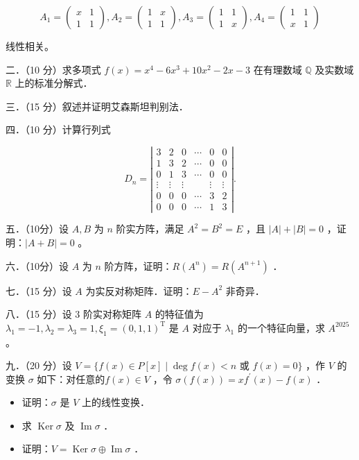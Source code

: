 \documentclass{article}
\begin{document}
\[
A_{1}=\left(\begin{array}{ll}
x & 1 \\
1 & 1
\end{array}\right), A_{2}=\left(\begin{array}{ll}
1 & x \\
1 & 1
\end{array}\right), A_{3}=\left(\begin{array}{ll}
1 & 1 \\
1 & x
\end{array}\right), A_{4}=\left(\begin{array}{ll}
1 & 1 \\
x & 1
\end{array}\right)
\]

线性相关。

二．（10 分）求多项式 \(f(x)=x^{4}-6 x^{3}+10 x^{2}-2 x-3\) 在有理数域 \(\mathbb{Q}\) 及实数域 \(\mathbb{R}\) 上的标准分解式．

三．（15 分）叙述并证明艾森斯坦判别法．

四．（10 分）计算行列式

\[
D_{n}=\left|\begin{array}{cccccc}
3 & 2 & 0 & \cdots & 0 & 0 \\
1 & 3 & 2 & \cdots & 0 & 0 \\
0 & 1 & 3 & \cdots & 0 & 0 \\
\vdots & \vdots & \vdots & & \vdots & \vdots \\
0 & 0 & 0 & \cdots & 3 & 2 \\
0 & 0 & 0 & \cdots & 1 & 3
\end{array}\right| .
\]

五．（10分）设 \(A, B\) 为 \(n\) 阶实方阵，满足 \(A^{2}=B^{2}=E\) ，且 \(|A|+|B|=0\) ，证明：\(|A+B|=0\) 。

六．（10分）设 \(A\) 为 \(n\) 阶方阵，证明：\(R\left(A^{n}\right)=R\left(A^{n+1}\right)\) ．

七．（15 分）设 \(A\) 为实反对称矩阵．证明：\(E-A^{2}\) 非奇异．

八．（15 分）设 3 阶实对称矩阵 \(A\) 的特征值为 \(\lambda_{1}=-1, \lambda_{2}=\lambda_{3}=1, \xi_{1}=(0,1,1)^{\mathrm{T}}\) 是 \(A\) 对应于 \(\lambda_{1}\) 的一个特征向量，求 \(A^{2025}\) 。

九．（20 分）设 \(V=\{f(x) \in P[x] \mid \operatorname{deg} f(x)<n\) 或 \(f(x)=0\}\) ，作 \(V\) 的变换 \(\sigma\) 如下：对任意的\(f(x) \in V\) ，令 \(\sigma(f(x))=x f^{\prime}(x)-f(x)\) ．

\begin{itemize}

  \item[1．] 证明：\(\sigma\) 是 \(V\) 上的线性变换．

  \item[2．] 求 \(\operatorname{Ker} \sigma\) 及 \(\operatorname{Im} \sigma\) ．

  \item[3．] 证明：\(V=\operatorname{Ker} \sigma \oplus \operatorname{Im} \sigma\) ．
\end{itemize}
\end{document}
